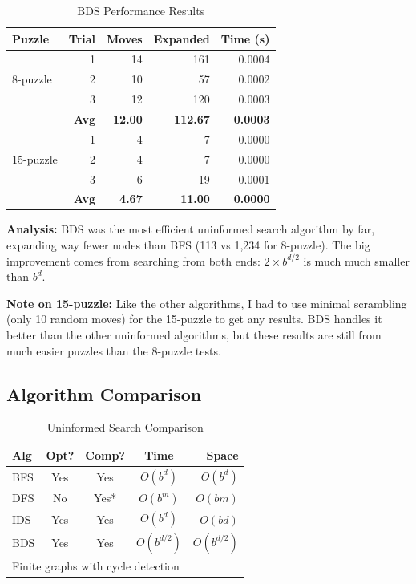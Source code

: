 \documentclass[letterpaper]{article}
\begin{document}
\begin{table}[h]
\centering
\tiny
\begin{tabular}{lrrrr}
\toprule
\textbf{Puzzle} & \textbf{Trial} & \textbf{Moves} & \textbf{Expanded} & \textbf{Time (s)} \\
\midrule
\multirow{3}{*}{8-puzzle} & 1 & 14 & 161 & 0.0004 \\
& 2 & 10 & 57 & 0.0002 \\
& 3 & 12 & 120 & 0.0003 \\
\cmidrule{2-5}
& \textbf{Avg} & \textbf{12.00} & \textbf{112.67} & \textbf{0.0003} \\
\midrule
\multirow{3}{*}{15-puzzle} & 1 & 4 & 7 & 0.0000 \\
& 2 & 4 & 7 & 0.0000 \\
& 3 & 6 & 19 & 0.0001 \\
\cmidrule{2-5}
& \textbf{Avg} & \textbf{4.67} & \textbf{11.00} & \textbf{0.0000} \\
\bottomrule
\end{tabular}
\caption{BDS Performance Results}
\end{table}

\textbf{Analysis:} BDS was the most efficient uninformed search algorithm by far, expanding way fewer nodes than BFS (113 vs 1,234 for 8-puzzle). The big improvement comes from searching from both ends: $2 \times b^{d/2}$ is much much smaller than $b^d$.

\textbf{Note on 15-puzzle:} Like the other algorithms, I had to use minimal scrambling (only 10 random moves) for the 15-puzzle to get any results. BDS handles it better than the other uninformed algorithms, but these results are still from much easier puzzles than the 8-puzzle tests.

\subsection{Algorithm Comparison}

\begin{table}[h]
\centering
\tiny
\begin{tabular}{lcccr}
\toprule
\textbf{Alg} & \textbf{Opt?} & \textbf{Comp?} & \textbf{Time} & \textbf{Space} \\
\midrule
BFS & Yes & Yes & $O(b^d)$ & $O(b^d)$ \\
DFS & No & Yes* & $O(b^m)$ & $O(bm)$ \\
IDS & Yes & Yes & $O(b^d)$ & $O(bd)$ \\
BDS & Yes & Yes & $O(b^{d/2})$ & $O(b^{d/2})$ \\
\bottomrule
\multicolumn{5}{l}{\tiny *Finite graphs with cycle detection}
\end{tabular}
\caption{Uninformed Search Comparison}
\end{table}
\end{document}

